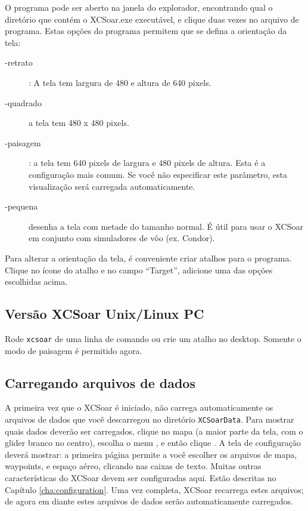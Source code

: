 O programa pode ser aberto na janela do explorador, encontrando qual o diretório que contém o XCSoar.exe executável, e clique duas vezes no arquivo de programa.
Estas opções do programa permitem que se defina a orientação da tela:

\begin{description}
\item[-retrato] :   A tela tem largura de 480 e altura de 640 pixels.
\item[-quadrado] a tela tem 480 x 480 pixels.
\item[-paisagem] :   a tela tem 640 pixels de largura e 480 pixels de altura.  Esta é a configuração mais comum.  Se você não especificar este parâmetro, esta visualização será carregada automaticamente.
\item[-pequena] desenha a tela com metade do tamanho normal.  É útil para usar o XCSoar em conjunto com simuladores de vôo (ex. Condor).
\end{description}
Para alterar a orientação da tela, é conveniente criar atalhos para o programa.  Clique no ícone do atalho e no campo “Target”, adicione uma das opções escolhidas acima.

\subsection*{Versão XCSoar Unix/Linux PC}
Rode \verb|xcsoar| de uma linha de comando ou crie um atalho no desktop.  
Somente o modo de paisagem é permitido agora.


\subsection*{Carregando arquivos de dados}\label{sec:loaddatafiles}
A primeira vez que o XCSoar é iniciado, não carrega automaticamente os arquivos de dados que você descarregou no diretório \verb|XCSoarData|.  
Para mostrar quais dados deverão ser carregados, clique no mapa (a maior parte da tela, com o glider branco no centro), escolha o menu , e então clique 
.  A tela de configuração deverá mostrar:
a primeira página permite a você escolher os arquivos de mapa, waypoints, e espaço aéreo, clicando nas caixas de texto.  Muitas outras características do XCSoar devem ser configuradas aqui.  Estão descritas no Capítulo 
\ref{cha:configuration}.
Uma vez completa, XCSoar recarrega estes arquivos; de agora em diante estes arquivos de dados serão automaticamente carregados.

